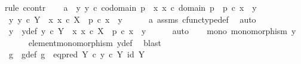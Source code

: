 \begin{isabellebody}
\isamarkupfalse%
{\isacharparenleft}{\kern0pt}rule\ ccontr{\isacharparenright}{\kern0pt}\isanewline
\ \ \isamarkupfalse%
\ a{}{\isacharcolon}{\kern0pt}\ {\isachardoublequoteopen}{\isasymnot}\ {\isacharparenleft}{\kern0pt}{\isasymforall}y{\isachardot}{\kern0pt}\ y\ {\isasymin}\isactrlsub c\ codomain\ p\ {\isasymlongrightarrow}\ {\isacharparenleft}{\kern0pt}{\isasymexists}x{\isachardot}{\kern0pt}\ x\ {\isasymin}\isactrlsub c\ domain\ p\ {\isasymand}\ p\ {\isasymcirc}\isactrlsub c\ x\ {\isacharequal}{\kern0pt}\ y{\isacharparenright}{\kern0pt}{\isacharparenright}{\kern0pt}{\isachardoublequoteclose}\isanewline
\ \ \isamarkupfalse%
\ {\isachardoublequoteopen}{\isasymexists}y{\isachardot}{\kern0pt}\ y\ {\isasymin}\isactrlsub c\ Y\ {\isasymand}\ {\isasymnot}{\isacharparenleft}{\kern0pt}{\isasymexists}x{\isachardot}{\kern0pt}\ x\ {\isasymin}\isactrlsub c\ X\ {\isasymand}\ p\ {\isasymcirc}\isactrlsub c\ x\ {\isacharequal}{\kern0pt}\ y{\isacharparenright}{\kern0pt}{\isachardoublequoteclose}\isanewline
\ \ \ \ \isamarkupfalse%
\ a{}\ assms{\isacharparenleft}{\kern0pt}{}{\isacharparenright}{\kern0pt}\ cfunc{\isacharunderscore}{\kern0pt}type{\isacharunderscore}{\kern0pt}def\ \isamarkupfalse%
\ auto\isanewline
\ \ \isamarkupfalse%
\ \isamarkupfalse%
\ y{}\ \ y{\isacharunderscore}{\kern0pt}def{\isacharcolon}{\kern0pt}\ {\isachardoublequoteopen}y{}\ {\isasymin}\isactrlsub c\ Y\ {\isasymand}\ {\isacharparenleft}{\kern0pt}{\isasymforall}x{\isachardot}{\kern0pt}\ x\ {\isasymin}\isactrlsub c\ X\ {\isasymlongrightarrow}\ p\ {\isasymcirc}\isactrlsub c\ x\ {\isasymnoteq}\ y{}{\isacharparenright}{\kern0pt}{\isachardoublequoteclose}\isanewline
\ \ \ \ \isamarkupfalse%
\ auto\isanewline
\ \ \isamarkupfalse%
\ mono{\isacharcolon}{\kern0pt}\ {\isachardoublequoteopen}monomorphism\ y{}{\isachardoublequoteclose}\isanewline
\ \ \ \ \isamarkupfalse%
\ element{\isacharunderscore}{\kern0pt}monomorphism\ y{\isacharunderscore}{\kern0pt}def\ \isamarkupfalse%
\ blast\isanewline
\ \ \isamarkupfalse%
\ g\ \ g{\isacharunderscore}{\kern0pt}def{\isacharcolon}{\kern0pt}\ {\isachardoublequoteopen}g\ {\isacharequal}{\kern0pt}\ eq{\isacharunderscore}{\kern0pt}pred\ Y\ {\isasymcirc}\isactrlsub c\ {\isasymlangle}y{}\ {\isasymcirc}\isactrlsub c\ {\isasymbeta}\isactrlbsub Y\isactrlesub {\isacharcomma}{\kern0pt}\ id\ Y{\isasymrangle}{\isachardoublequoteclose}\isanewline

\end{isabellebody}
